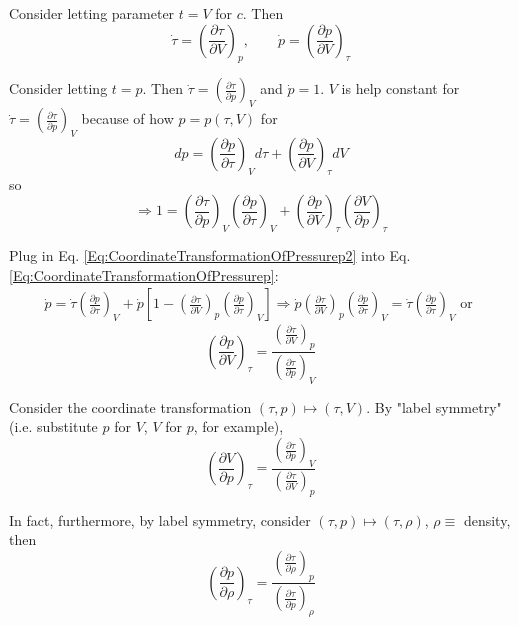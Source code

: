 Consider letting parameter $t=V$ for $c$. Then
\[
\dot{\tau} = \left( \frac{ \partial \tau }{ \partial V } \right)_p, \qquad \dot{p} = \left( \frac{ \partial p }{ \partial V} \right)_{\tau}
\]

Consider letting $t=p$. Then $\dot{\tau} = \left( \frac{ \partial \tau}{ \partial p} \right)_V$ and $\dot{p} = 1$. $V$ is help constant for $\dot{\tau} = \left( \frac{ \partial \tau}{ \partial p} \right)_V$ because of how $p = p(\tau, V)$ for 
\[
dp = \left(\frac{ \partial p}{ \partial \tau} \right)_V d\tau + \left( \frac{ \partial p }{ \partial V} \right)_{\tau} dV
\]
so
\begin{equation}\label{Eq:CoordinateTransformationOfPressurep2}
\Longrightarrow 1 = \left( \frac{ \partial \tau }{ \partial p } \right)_V \left( \frac{ \partial p }{ \partial \tau } \right)_V + \left( \frac{ \partial p }{ \partial V } \right)_{\tau} \left( \frac{ \partial V }{ \partial p } \right)_{\tau}
\end{equation}

Plug in Eq. \ref{Eq:CoordinateTransformationOfPressurep2} into Eq. \ref{Eq:CoordinateTransformationOfPressurep}:
\[
\begin{gathered}
	\dot{p} = \dot{\tau} \left( \frac{ \partial p}{ \partial \tau} \right)_V + \dot{p} \left[ 1 - \left( \frac{ \partial \tau}{ \partial V} \right)_p \left( \frac{\partial p}{ \partial \tau} \right)_V \right] \Longrightarrow \dot{p} \left( \frac{ \partial \tau }{ \partial V } \right)_p \left( \frac{ \partial p }{ \partial \tau } \right)_V = \dot{\tau} \left( \frac{ \partial p }{ \partial \tau } \right)_V \text{ or }
\end{gathered}
\]
\begin{equation}
\boxed{ \left( \frac{ \partial p }{ \partial V} \right)_{\tau} = \frac{\left( \frac{ \partial \tau }{ \partial V } \right)_p }{ \left( \frac{ \partial \tau }{ \partial p } \right)_V} }
\end{equation}

Consider the coordinate transformation $(\tau, p) \mapsto (\tau, V)$. By "label symmetry" (i.e. substitute $p$ for $V$, $V$ for $p$, for example),
\begin{equation}
\boxed{ \left( \frac{\partial V}{ \partial p } \right)_{\tau} = \frac{ \left( \frac{ \partial \tau }{ \partial p } \right)_V}{ \left( \frac{ \partial \tau }{ \partial V } \right)_p } }
\end{equation}

In fact, furthermore, by label symmetry, consider $(\tau, p) \mapsto (\tau, \rho)$, $\rho \equiv $ density, then
\begin{equation}
\boxed{ \left( \frac{\partial p}{ \partial \rho } \right)_{\tau} = \frac{ \left( \frac{ \partial \tau }{ \partial \rho } \right)_p}{ \left( \frac{ \partial \tau }{ \partial p } \right)_{\rho} } }
\end{equation}

